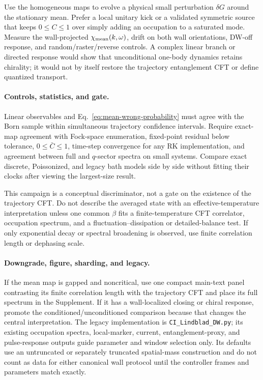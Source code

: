 \documentclass[aps,prx,onecolumn,nofootinbib,superscriptaddress,longbibliography]{revtex4-2}
\newcommand{\code}[1]{\texttt{#1}}
\begin{document}
Use the homogeneous maps to evolve a physical small perturbation $\delta G$ around the
stationary mean.  Prefer a local unitary kick or a validated symmetric source that keeps
$0\le C\le1$ over simply adding an occupation to a saturated mode.  Measure the
wall-projected $\chi_{\rm mean}(k,\omega)$, drift on both wall orientations, DW-off
response, and random/raster/reverse controls.  A complex linear branch or directed response
would show that unconditional one-body dynamics retains chirality; it would not by itself
restore the trajectory entanglement CFT or define quantized transport.

\paragraph{Controls, statistics, and gate.}
Linear observables and Eq.~\eqref{eq:mean-wrong-probability} must agree with the Born sample
within simultaneous trajectory confidence intervals.  Require exact-map agreement with
Fock-space enumeration, fixed-point residual below tolerance, $0\le\bar C\le1$, time-step
convergence for any RK implementation, and agreement between full and $q$-sector spectra
on small systems.  Compare exact discrete, Poissonized, and legacy bath models side by
side without fitting their clocks after viewing the largest-size result.

This campaign is a conceptual discriminator, not a gate on the existence of the
trajectory CFT.  Do not describe the averaged state with an effective-temperature
interpretation unless one common $\beta$ fits a finite-temperature CFT correlator,
occupation spectrum, and a fluctuation--dissipation or detailed-balance test.  If only
exponential decay or spectral broadening is observed, use finite correlation length or
dephasing scale.

\paragraph{Downgrade, figure, sharding, and legacy.}
If the mean map is gapped and noncritical, use one compact main-text panel contrasting its
finite correlation length with the trajectory CFT and place its full spectrum in the
Supplement.  If it has a wall-localized closing or chiral response, promote the
conditioned/unconditioned comparison because that changes the central interpretation.
The legacy implementation is \code{CI\_Lindblad\_DW.py}; its existing occupation spectra,
local-marker, current, entanglement-proxy, and pulse-response outputs guide parameter and
window selection only.  Its defaults use an untruncated or separately truncated
spatial-mass construction and do not count as data for either canonical wall protocol
until the controller frames and parameters match exactly.
\end{document}
